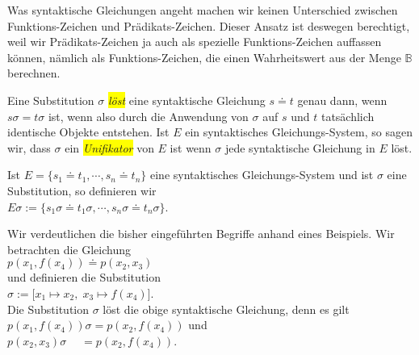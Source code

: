 Was syntaktische Gleichungen angeht machen wir keinen Unterschied zwischen Funktions-Zeichen und
Pr\"{a}dikats-Zeichen.   Dieser Ansatz ist deswegen berechtigt, weil wir Pr\"{a}dikats-Zeichen
ja auch als spezielle Funktions-Zeichen auffassen k\"{o}nnen, n\"{a}mlich als 
Funktions-Zeichen, die einen Wahrheitswert aus der Menge   $\mathbb{B}$ berechnen.

\begin{Definition}[Unifikator]
Eine Substitution $\sigma$ \colorbox{yellow}{\emph{l\"{o}st}} eine syntaktische Gleichung $s \doteq t$ genau dann, wenn
$s\sigma = t\sigma$ ist, wenn also durch die Anwendung von $\sigma$ auf $s$ und $t$
tats\"{a}chlich identische Objekte entstehen.  Ist $E$ ein syntaktisches Gleichungs-System, so 
sagen wir, dass $\sigma$ ein \colorbox{yellow}{\emph{Unifikator}} von $E$ ist wenn $\sigma$ jede
syntaktische Gleichung in $E$ l\"{o}st. 
\eox
\end{Definition}
Ist $E = \{ s_1 \doteq t_1, \cdots, s_n \doteq t_n \}$ eine syntaktisches Gleichungs-System
und ist $\sigma$ eine Substitution, so definieren wir \\[0.2cm]
\hspace*{1.3cm}  $E\sigma := \{ s_1\sigma \doteq t_1\sigma, \cdots, s_n\sigma \doteq t_n\sigma \}$.
\vspace{0.3cm}

\example
Wir verdeutlichen die bisher eingef\"{u}hrten Begriffe anhand eines Beispiels.  
Wir betrachten die Gleichung \\[0.2cm]
\hspace*{1.3cm} $p(x_1, f(x_4)) \doteq p( x_2, x_3)$ \\[0.2cm]
und definieren die Substitution \\[0.2cm]
\hspace*{1.3cm} $\sigma := \big[ x_1 \mapsto x_2,\; x_3 \mapsto f(x_4) \big]$. \\[0.2cm]
Die Substitution $\sigma$ l\"{o}st die obige syntaktische Gleichung, denn es gilt \\[0.2cm]
\hspace*{1.3cm} $p(x_1, f(x_4))\sigma = p(x_2, f(x_4))$ \quad und \quad \\[0.2cm]
\hspace*{1.3cm} $p(x_2, x_3)\sigma \;\quad = p(x_2, f(x_4))$.  \eox



